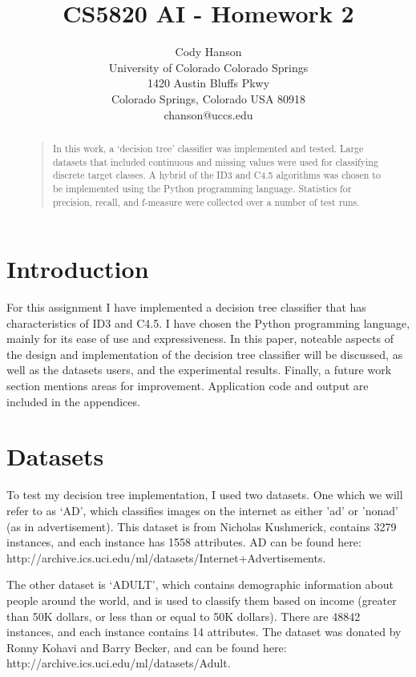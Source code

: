 \documentclass[letterpaper]{article}
\begin{document}
\title{CS5820 AI - Homework 2}
\author{Cody Hanson\\
University of Colorado Colorado Springs\\
1420 Austin Bluffs Pkwy\\
Colorado Springs, Colorado USA 80918\\
chanson@uccs.edu}
\maketitle
\begin{abstract}
\begin{quote}
In this work, a `decision tree' classifier was implemented and tested. Large datasets that included continuous and missing values were used for classifying discrete target classes. A hybrid of the ID3 and C4.5 algorithms was chosen to be implemented using the Python programming language. Statistics for precision, recall, and f-measure were collected over a number of test runs.
\end{quote}
\end{abstract}

\section{Introduction}

For this assignment I have implemented a decision tree classifier that has characteristics of ID3 and C4.5. I have chosen the Python programming language, mainly for its ease of use and expressiveness. In this paper, noteable aspects of the design and implementation of the decision tree classifier will be discussed, as well as the datasets users, and the experimental results. Finally, a future work section mentions areas for improvement. Application code and output are included in the appendices.

\section{Datasets}
To test my decision tree implementation, I used two datasets. One which we will refer to as `AD', which classifies images on the internet as either 'ad' or 'nonad' (as in advertisement). This dataset is from  Nicholas Kushmerick, contains 3279 instances, and each instance has 1558 attributes. AD can be found here: http://archive.ics.uci.edu/ml/datasets/Internet+Advertisements.

The other dataset is `ADULT', which contains demographic information about people around the world, and is used to classify them based on income (greater than 50K dollars, or less than or equal to 50K dollars). There are 48842 instances, and each instance contains 14 attributes. The dataset was donated by Ronny Kohavi and Barry Becker, and can be found here: http://archive.ics.uci.edu/ml/datasets/Adult.
\end{document}
